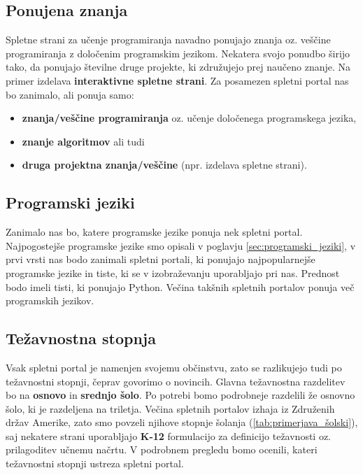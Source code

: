 \subsection{Ponujena znanja}
\label{sec:vsebina_problemsk_pristop}

Spletne strani za učenje programiranja navadno ponujajo znanja oz.
veščine programiranja z določenim programskim jezikom. Nekatera svojo
ponudbo širijo tako, da ponujajo številne druge projekte, ki
združujejo prej naučeno znanje. Na primer izdelava
\textbf{interaktivne spletne strani}. Za posamezen spletni portal nas
bo zanimalo, ali ponuja samo:

\begin{itemize}
  \tightlist
\item \textbf{znanja/veščine programiranja} oz. učenje določenega
  programskega jezika,
\item \textbf{znanje algoritmov} ali tudi
\item \textbf{druga projektna znanja/veščine} (npr. izdelava spletne
  strani).
\end{itemize}


\subsection{Programski jeziki}
\label{sec:_zanaja_programski_jeziki}

Zanimalo nas bo, katere programske jezike ponuja nek spletni
portal. Najpogostejše programske jezike smo opisali v poglavju
\ref{sec:programski_jeziki}, v prvi vrsti nas bodo zanimali spletni
portali, ki ponujajo najpopularnejše programske jezike in tiste, ki
se v izobraževanju uporabljajo pri nas. Prednost bodo imeli tisti,
ki ponujajo Python. Večina takšnih spletnih portalov ponuja več
programskih jezikov.

\subsection{Težavnostna stopnja}
\label{sec:težavnostna_stopnja}

Vsak spletni portal je namenjen svojemu občinstvu, zato se razlikujejo tudi po težavnostni stopnji, čeprav govorimo o novincih. Glavna
težavnostna razdelitev bo na \textbf{osnovo} in \textbf{srednjo
  šolo}. Po potrebi bomo podrobneje razdelili že osnovno šolo, ki je
razdeljena na triletja. Večina spletnih portalov izhaja iz Združenih
držav Amerike, zato smo povzeli njihove stopnje šolanja
(\ref{tab:primerjava_šolski}), saj nekatere strani uporabljajo
\textbf{K-12} formulacijo za definicijo težavnosti oz. prilagoditev
učnemu načrtu. V podrobnem pregledu bomo ocenili, kateri težavnostni
stopnji ustreza spletni portal.

